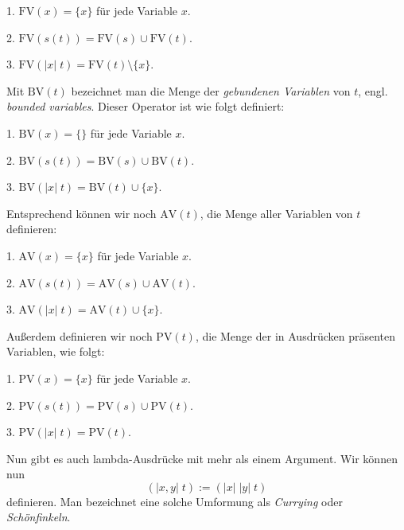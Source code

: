 \documentclass[a4paper,11pt,fleqn,twocolumn,twoside]{article}
\numberwithin{equation}{section}
\begin{document}
1. $\mathrm{FV}(x) = \{x\}$ für jede Variable $x$.

2. $\mathrm{FV}(s(t)) = \mathrm{FV}(s)\cup\mathrm{FV}(t)$.

3. $\mathrm{FV}(|x|\; t) = \mathrm{FV}(t)\setminus\{x\}$.

\noindent
Mit $\mathrm{BV}(t)$ bezeichnet man die Menge der \emph{gebundenen
Variablen} von $t$, engl. \emph{bounded variables}.
Dieser Operator ist wie folgt definiert:

1. $\mathrm{BV}(x) = \{\}$ für jede Variable $x$.

2. $\mathrm{BV}(s(t)) = \mathrm{BV}(s)\cup\mathrm{BV}(t)$.

3. $\mathrm{BV}(|x|\; t) = \mathrm{BV}(t)\cup\{x\}$.

\noindent
Entsprechend können wir noch $\mathrm{AV}(t)$, die Menge aller
Variablen von $t$ definieren:

1. $\mathrm{AV}(x) = \{x\}$ für jede Variable $x$.

2. $\mathrm{AV}(s(t)) = \mathrm{AV}(s)\cup\mathrm{AV}(t)$.

3. $\mathrm{AV}(|x|\; t) = \mathrm{AV}(t)\cup\{x\}$.

\newpage

\noindent
Außerdem definieren wir noch $\mathrm{PV}(t)$, die Menge der
in Ausdrücken präsenten Variablen, wie folgt:

1. $\mathrm{PV}(x) = \{x\}$ für jede Variable $x$.

2. $\mathrm{PV}(s(t)) = \mathrm{PV}(s)\cup\mathrm{PV}(t)$.

3. $\mathrm{PV}(|x|\; t) = \mathrm{PV}(t)$.


Nun gibt es auch lambda-Ausdrücke mit mehr als einem Argument.
Wir können nun
\begin{equation}
(|x,y|\; t) := (|x|\;|y|\;t)
\end{equation}
definieren. Man bezeichnet eine solche Umformung als \emph{Currying}
oder \emph{Schönfinkeln}.
\end{document}
